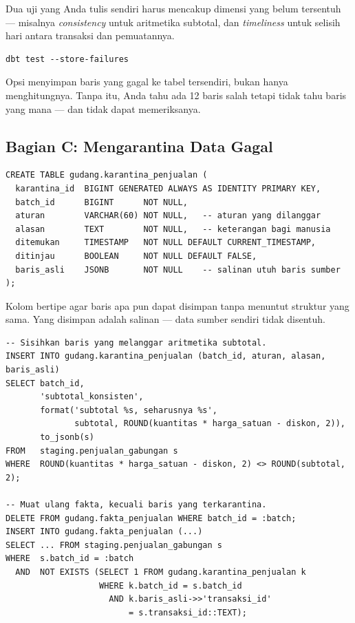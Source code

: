 Dua uji yang Anda tulis sendiri harus mencakup dimensi yang belum tersentuh ---
misalnya \emph{consistency} untuk aritmetika subtotal, dan \emph{timeliness}
untuk selisih hari antara transaksi dan pemuatannya.

\begin{lstlisting}[style=shellgaya]
dbt test --store-failures
\end{lstlisting}

\begin{catatan}
Opsi  menyimpan baris yang gagal ke tabel
tersendiri, bukan hanya menghitungnya. Tanpa itu, Anda tahu ada 12 baris salah
tetapi tidak tahu baris yang mana --- dan tidak dapat memeriksanya.
\end{catatan}

\subsection{Bagian C: Mengarantina Data Gagal}


\begin{lstlisting}[style=sqlgaya]
CREATE TABLE gudang.karantina_penjualan (
  karantina_id  BIGINT GENERATED ALWAYS AS IDENTITY PRIMARY KEY,
  batch_id      BIGINT      NOT NULL,
  aturan        VARCHAR(60) NOT NULL,   -- aturan yang dilanggar
  alasan        TEXT        NOT NULL,   -- keterangan bagi manusia
  ditemukan     TIMESTAMP   NOT NULL DEFAULT CURRENT_TIMESTAMP,
  ditinjau      BOOLEAN     NOT NULL DEFAULT FALSE,
  baris_asli    JSONB       NOT NULL    -- salinan utuh baris sumber
);
\end{lstlisting}

Kolom  bertipe  agar baris apa pun dapat
disimpan tanpa menuntut struktur yang sama. Yang disimpan adalah salinan ---
data sumber sendiri tidak disentuh.


\begin{lstlisting}[style=sqlgaya]
-- Sisihkan baris yang melanggar aritmetika subtotal.
INSERT INTO gudang.karantina_penjualan (batch_id, aturan, alasan, baris_asli)
SELECT batch_id,
       'subtotal_konsisten',
       format('subtotal %s, seharusnya %s',
              subtotal, ROUND(kuantitas * harga_satuan - diskon, 2)),
       to_jsonb(s)
FROM   staging.penjualan_gabungan s
WHERE  ROUND(kuantitas * harga_satuan - diskon, 2) <> ROUND(subtotal, 2);

-- Muat ulang fakta, kecuali baris yang terkarantina.
DELETE FROM gudang.fakta_penjualan WHERE batch_id = :batch;
INSERT INTO gudang.fakta_penjualan (...)
SELECT ... FROM staging.penjualan_gabungan s
WHERE  s.batch_id = :batch
  AND  NOT EXISTS (SELECT 1 FROM gudang.karantina_penjualan k
                   WHERE k.batch_id = s.batch_id
                     AND k.baris_asli->>'transaksi_id'
                         = s.transaksi_id::TEXT);
\end{lstlisting}

